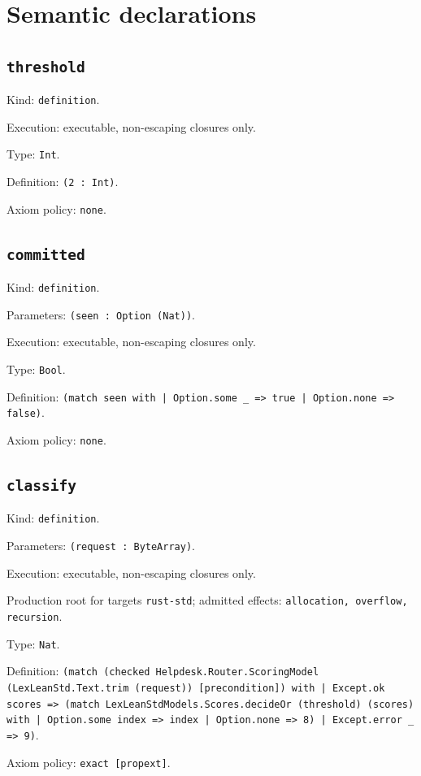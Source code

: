 \documentclass[11pt]{article}
\begin{document}
\section*{Semantic declarations}
\subsection*{\texttt{threshold}}
\noindent Kind: \texttt{definition}.\par
\noindent Execution: executable, non-escaping closures only.\par
\noindent Type: \texttt{Int}.\par
\noindent Definition: \texttt{(2 : Int)}.\par
\noindent Axiom policy: \texttt{none}.\par
\subsection*{\texttt{committed}}
\noindent Kind: \texttt{definition}.\par
\noindent Parameters: \texttt{(seen : Option (Nat))}.\par
\noindent Execution: executable, non-escaping closures only.\par
\noindent Type: \texttt{Bool}.\par
\noindent Definition: \texttt{(match seen with | Option.some \_ => true | Option.none => false)}.\par
\noindent Axiom policy: \texttt{none}.\par
\subsection*{\texttt{classify}}
\noindent Kind: \texttt{definition}.\par
\noindent Parameters: \texttt{(request : ByteArray)}.\par
\noindent Execution: executable, non-escaping closures only.\par
\noindent Production root for targets \texttt{rust-std}; admitted effects: \texttt{allocation, overflow, recursion}.\par
\noindent Type: \texttt{Nat}.\par
\noindent Definition: \texttt{(match (checked Helpdesk.Router.ScoringModel (LexLeanStd.Text.trim (request)) [precondition]) with | Except.ok scores => (match LexLeanStdModels.Scores.decideOr (threshold) (scores) with | Option.some index => index | Option.none => 8) | Except.error \_ => 9)}.\par
\noindent Axiom policy: \texttt{exact [propext]}.\par
\end{document}
